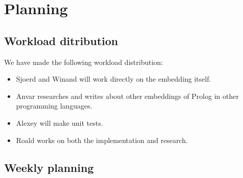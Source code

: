 \documentclass[a4paper]{article}
\begin{document}
\section{Planning}
\subsection{Workload ditribution}

We have made the following workload distribution:
\begin{itemize}
\item Sjoerd and Winand will work directly on the embedding itself.
\item Anvar researches and writes about other embeddings of Prolog in other programming languages.
\item Alexey will make unit tests.
\item Roald works on both the implementation and research.
\end{itemize}


\subsection{Weekly planning}
\end{document}
